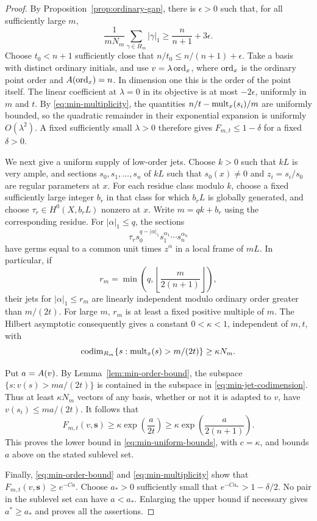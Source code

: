 \begin{proof}
By Proposition~\ref{prop:ordinary-gap}, there is $\epsilon>0$ such
that, for all sufficiently large $m$,
\[
 \frac1{mN_m}\sum_{\gamma\in H_m}|\gamma|_1
       \geq\frac n{n+1}+3\epsilon.
\]
Choose $t_0<n+1$ sufficiently close that
$n/t_0\leq n/(n+1)+\epsilon$. Take a basis with distinct ordinary
initials, and use $v=\lambda\operatorname{ord}_x$, where $\operatorname{ord}_x$ is the
ordinary point order and $A(\operatorname{ord}_x)=n$. In dimension one this is
the order of the point itself. The linear coefficient at $\lambda=0$
in its objective is at most $-2\epsilon$, uniformly in $m$ and $t$.
By \eqref{eq:min-multiplicity}, the quantities
$n/t-\operatorname{mult}_x(s_i)/m$ are uniformly bounded, so the quadratic remainder
in their exponential expansion is uniformly $O(\lambda^2)$. A fixed
sufficiently small $\lambda>0$ therefore gives
$F_{m,t}\leq1-\delta$ for a fixed $\delta>0$.

We next give a uniform supply of low-order jets. Choose $k>0$ such that
$kL$ is very ample, and sections $s_0,s_1,\ldots,s_n$ of $kL$ such
that $s_0(x)\ne0$ and $z_i=s_i/s_0$ are regular parameters at $x$.
For each residue class modulo $k$, choose a fixed sufficiently large
integer $b_r$ in that class for which $b_rL$ is globally generated,
and choose $\tau_r\in H^0(X,b_rL)$ nonzero at $x$. Write
$m=qk+b_r$ using the corresponding residue. For $|\alpha|_1\leq q$,
the sections
\[
 \tau_r s_0^{q-|\alpha|_1}s_1^{\alpha_1}\cdots s_n^{\alpha_n}
\]
have germs equal to a common unit times $z^\alpha$ in a local frame
of $mL$. In particular, if
\[
 r_m=\min\left(q,\left\lfloor\frac{m}{2(n+1)}\right\rfloor\right),
\]
their jets for $|\alpha|_1\leq r_m$ are linearly independent modulo
ordinary order greater than $m/(2t)$. For large $m$, $r_m$ is at least
a fixed positive multiple of $m$. The Hilbert asymptotic consequently
gives a constant $0<\kappa<1$, independent of $m,t$, with
\begin{equation}
\label{eq:min-jet-codimension}
 \operatorname{codim}_{R_m}\{s:\operatorname{mult}_x(s)>m/(2t)\}\geq\kappa N_m.
\end{equation}

Put $a=A(v)$. By Lemma~\ref{lem:min-order-bound}, the subspace
$\{s:v(s)>ma/(2t)\}$ is contained in the subspace in
\eqref{eq:min-jet-codimension}. Thus at least $\kappa N_m$ vectors
of any basis, whether or not it is adapted to $v$, have
$v(s_i)\leq ma/(2t)$. It follows that
\begin{equation}
\label{eq:min-coercive-exponential}
 F_{m,t}(v,\mathbf s)
   \geq\kappa\exp\!\left(\frac a{2t}\right)
   \geq\kappa\exp\!\left(\frac a{2(n+1)}\right).
\end{equation}
This proves the lower bound in \eqref{eq:min-uniform-bounds}, with
$c=\kappa$, and bounds $a$ above on the stated sublevel set.

Finally, \eqref{eq:min-order-bound} and
\eqref{eq:min-multiplicity} show that
$F_{m,t}(v,\mathbf s)\geq e^{-Ca}$. Choose $a_*>0$ sufficiently
small that $e^{-Ca_*}>1-\delta/2$. No pair in the sublevel set can
have $a<a_*$. Enlarging the upper bound if necessary gives
$a^*\geq a_*$ and proves all the assertions.
\end{proof}

